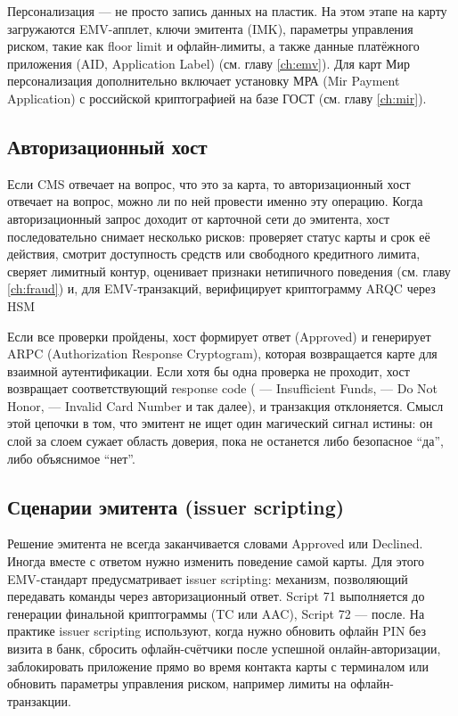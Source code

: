 Персонализация --- не просто запись данных на пластик. На этом
этапе на карту загружаются EMV-апплет, ключи эмитента (IMK),
параметры управления риском, такие как floor limit
и офлайн-лимиты, а также данные платёжного приложения
(AID, Application Label) (см. главу \ref{ch:emv})\cite{emvco-book3,emvco-book4}. Для карт Мир
персонализация дополнительно включает установку МРА
(Mir Payment Application) с российской криптографией
на базе ГОСТ (см. главу \ref{ch:mir}).

\subsection*{Авторизационный хост}

Если CMS отвечает на вопрос, что это за карта, то авторизационный
хост отвечает на вопрос, можно ли по ней провести именно эту
операцию. Когда авторизационный запрос доходит от карточной сети
до эмитента, хост последовательно снимает несколько рисков:
проверяет статус карты и срок её действия, смотрит доступность
средств или свободного кредитного лимита, сверяет лимитный
контур, оценивает признаки нетипичного поведения
(см. главу \ref{ch:fraud}) и, для EMV-транзакций, верифицирует
криптограмму ARQC через HSM
\cite{emvco-book2,emvco-book3}

Если все проверки пройдены, хост формирует ответ 
(Approved) и генерирует ARPC (Authorization Response
Cryptogram), которая возвращается карте для взаимной
аутентификации. Если хотя бы одна проверка не проходит,
хост возвращает соответствующий response code
( --- Insufficient Funds,  --- Do Not Honor,
 --- Invalid Card Number и так далее), и транзакция
отклоняется. Смысл этой цепочки в том, что эмитент не ищет
один магический сигнал истины: он слой за слоем сужает область
доверия, пока не останется либо безопасное \enquote{да},
либо объяснимое \enquote{нет}.\cite{emvco-book3}

\subsection*{Сценарии эмитента (issuer scripting)}

Решение эмитента не всегда заканчивается словами Approved
или Declined. Иногда вместе с ответом нужно изменить поведение
самой карты. Для этого EMV-стандарт предусматривает issuer
scripting: механизм, позволяющий передавать команды через
авторизационный ответ. Script 71 выполняется до генерации
финальной криптограммы (TC или AAC), Script 72 --- после.\cite{emvco-book3}
На практике issuer scripting используют, когда нужно обновить
офлайн PIN без визита в банк, сбросить офлайн-счётчики после
успешной онлайн-авторизации, заблокировать приложение прямо
во время контакта карты с терминалом или обновить параметры
управления риском, например лимиты на офлайн-транзакции.

